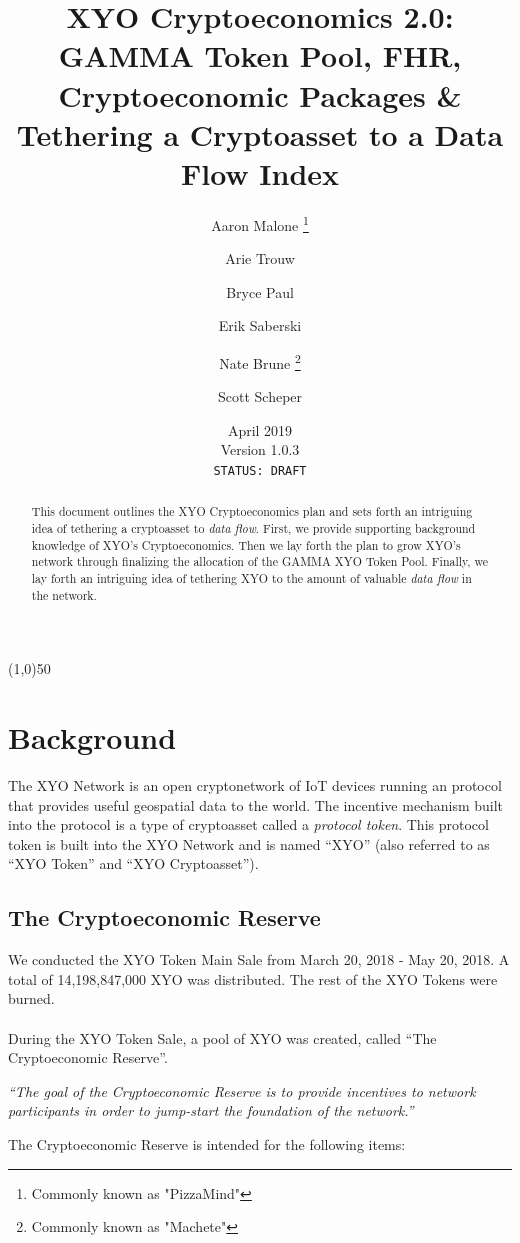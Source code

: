 \documentclass{article}
\title {XYO Cryptoeconomics 2.0: GAMMA Token Pool, FHR, Cryptoeconomic Packages \& Tethering a Cryptoasset to a Data Flow Index}
\author{
    Aaron Malone \thanks{Commonly known as "PizzaMind"}\\
    \and
    Arie Trouw\\
    \and    
    Bryce Paul\\
    \and
    Erik Saberski\\
    \and
    Nate Brune \thanks{Commonly known as "Machete"}\\
    \and
    Scott Scheper\\
}
\date{April 2019 \\ Version 1.0.3\\ \texttt{STATUS: DRAFT}}
\begin{document}
\pagecolor{limegreen}

\maketitle

\begin{center}
\line(1,0){50}
\end{center}

\begin{abstract}
This document outlines the XYO Cryptoeconomics plan and sets forth an intriguing idea of tethering a cryptoasset to \textit{data flow}. First, we provide supporting background knowledge of XYO's Cryptoeconomics. Then we lay forth the plan to grow XYO's network through finalizing the allocation of the GAMMA XYO Token Pool. Finally, we lay forth an intriguing idea of tethering XYO to the amount of valuable \textit{data flow} in the network.
\end{abstract}

\section{Background}
The XYO Network is an open cryptonetwork of IoT devices running an protocol that provides useful geospatial data to the world. The incentive mechanism built into the protocol is a type of cryptoasset called a \textit{protocol token}. This protocol token is built into the XYO Network and is named ``XYO'' (also referred to as ``XYO Token'' and ``XYO Cryptoasset'').

\subsection{The Cryptoeconomic Reserve}
We conducted the XYO Token Main Sale from March 20, 2018 - May 20, 2018. A total of 14,198,847,000 XYO was distributed. The rest of the XYO Tokens were burned.\\
\\During the XYO Token Sale, a pool of XYO was created, called “The Cryptoeconomic Reserve”.

\begin{displayquote}\textit{``The goal of the Cryptoeconomic Reserve is to provide incentives to network participants in order to jump-start the foundation of the network.''} \cite{crypto-reserve}
\end{displayquote}

The Cryptoeconomic Reserve is intended for the following items:
\end{document}
